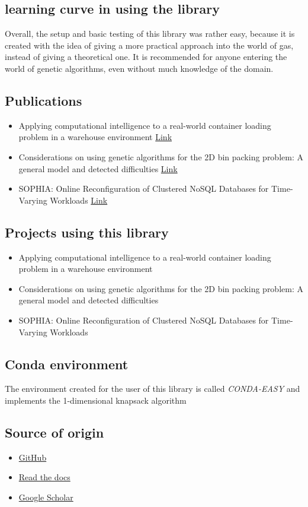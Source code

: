 \documentclass{article}
\begin{document}
\subsection{learning curve in using the library}
Overall, the setup and basic testing of this library was rather easy, because it is created with the idea of giving a more practical approach into the world of gas, instead of giving a theoretical one. It is recommended for anyone entering the world of genetic algorithms, even without much knowledge of the domain.
\subsection{Publications}
\begin{itemize}
    \item Applying computational intelligence to a real-world container loading problem in a warehouse environment \href{http://irep.ntu.ac.uk/id/eprint/33547/}{Link}
    \item Considerations on using genetic algorithms for the 2D bin packing problem: A general model and detected difficulties \href{https://ieeexplore.ieee.org/abstract/document/8107051}{Link}
    \item {SOPHIA}: Online Reconfiguration of Clustered NoSQL Databases for Time-Varying Workloads \href{https://www.usenix.org/conference/atc19/presentation/mahgoub}{Link}
\end{itemize}
\subsection{Projects using this library}
\begin{itemize}
    \item Applying computational intelligence to a real-world container loading problem in a warehouse environment
    \item Considerations on using genetic algorithms for the 2D bin packing problem: A general model and detected difficulties
    \item {SOPHIA}: Online Reconfiguration of Clustered NoSQL Databases for Time-Varying Workloads
\end{itemize}
\subsection{Conda environment}
The environment created for the user of this library is called \textit{CONDA-EASY} and implements the 1-dimensional knapsack algorithm
\subsection{Source of origin}
\begin{itemize}
    \item \href{https://github.com/remiomosowon/pyeasyga}{GitHub}
    \item \href{https://pyeasyga.readthedocs.io/en/latest/readme.html}{Read the docs}
    \item \href{https://scholar.google.com/scholar?hl=it&as_sdt=02C5&q=pyeasyga&btnG=}{Google Scholar}
    
\end{itemize}
\end{document}
